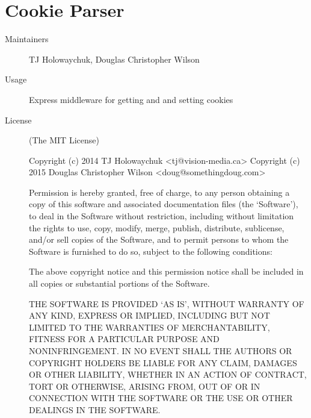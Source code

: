   \section*{Cookie Parser}
    \begin{description}
      \item[Maintainers] TJ Holowaychuk, Douglas Christopher Wilson
      \item[Usage] Express middleware for getting and and setting cookies
      \item[License] \scriptsize (The MIT License)

        Copyright (c) 2014 TJ Holowaychuk <tj@vision-media.ca>
        Copyright (c) 2015 Douglas Christopher Wilson <doug@somethingdoug.com>

        Permission is hereby granted, free of charge, to any person obtaining
        a copy of this software and associated documentation files (the
        `Software'), to deal in the Software without restriction, including
        without limitation the rights to use, copy, modify, merge, publish,
        distribute, sublicense, and/or sell copies of the Software, and to
        permit persons to whom the Software is furnished to do so, subject to
        the following conditions:

        The above copyright notice and this permission notice shall be
        included in all copies or substantial portions of the Software.

        THE SOFTWARE IS PROVIDED `AS IS', WITHOUT WARRANTY OF ANY KIND,
        EXPRESS OR IMPLIED, INCLUDING BUT NOT LIMITED TO THE WARRANTIES OF
        MERCHANTABILITY, FITNESS FOR A PARTICULAR PURPOSE AND NONINFRINGEMENT.
        IN NO EVENT SHALL THE AUTHORS OR COPYRIGHT HOLDERS BE LIABLE FOR ANY
        CLAIM, DAMAGES OR OTHER LIABILITY, WHETHER IN AN ACTION OF CONTRACT,
        TORT OR OTHERWISE, ARISING FROM, OUT OF OR IN CONNECTION WITH THE
        SOFTWARE OR THE USE OR OTHER DEALINGS IN THE SOFTWARE.
    \end{description}

